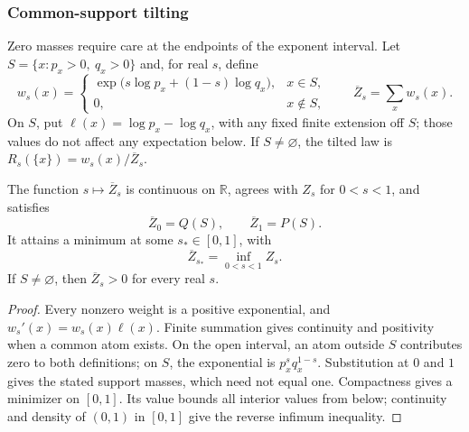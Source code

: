 \subsubsection{Common-support tilting}
\label{sec:chernoff-tilting}

Zero masses require care at the endpoints of the exponent interval.
Let $S=\{x:p_x>0,\ q_x>0\}$ and, for real $s$, define
\[
 w_s(x)=
 \begin{cases}
  \exp\bigl(s\log p_x+(1-s)\log q_x\bigr),&x\in S,\\
  0,&x\notin S,
 \end{cases}
 \qquad \overline Z_s=\sum_x w_s(x).
\]
On $S$, put $\ell(x)=\log p_x-\log q_x$, with any fixed finite
extension off $S$; those values do not affect any expectation below.
If $S\ne\varnothing$, the
tilted law is $R_s(\{x\})=w_s(x)/\overline Z_s$.

\begin{lemma}
\label{lem:chernoff-support-extension}
The function $s\mapsto\overline Z_s$ is continuous on
$\mathbb R$, agrees with $Z_s$ for $0<s<1$, and satisfies
\[
 \overline Z_0=Q(S),\qquad \overline Z_1=P(S).
\]
It attains a minimum at some $s_*\in[0,1]$, with
\[
 \overline Z_{s_*}=\inf_{0<s<1}Z_s.
\]
If $S\ne\varnothing$, then $\overline Z_s>0$ for every real $s$.
\end{lemma}
\begin{proof}
Every nonzero weight is a positive exponential, and
$w_s'(x)=w_s(x)\ell(x)$. Finite summation gives continuity
and positivity when a common atom exists. On the open interval,
an atom outside $S$ contributes zero to both definitions; on $S$,
the exponential is $p_x^sq_x^{1-s}$. Substitution at $0$ and $1$
gives the stated support masses, which need not equal one.
Compactness gives a minimizer on $[0,1]$. Its value bounds all
interior values from below; continuity and density of $(0,1)$ in
$[0,1]$ give the reverse infimum inequality.
\end{proof}

